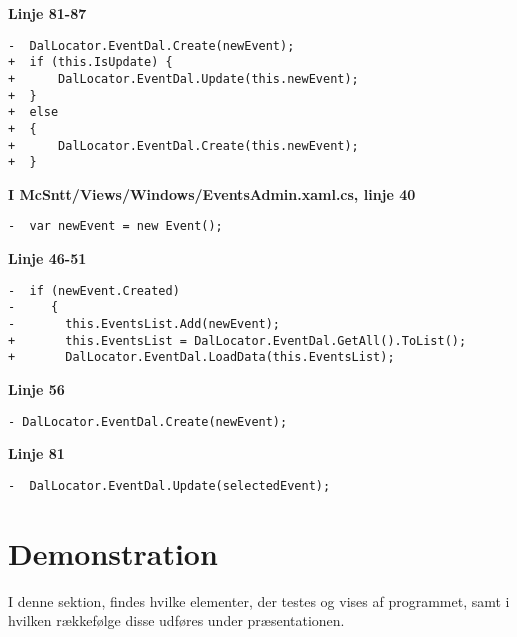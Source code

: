 \documentclass[a4paper,11pt,fleqn,twoside,openright,final]{memoir}
\begin{document}
\textbf{Linje 81-87}
\begin{lstlisting}[frame=single, label=fntpg-cb]
-  DalLocator.EventDal.Create(newEvent);
+  if (this.IsUpdate) {
+      DalLocator.EventDal.Update(this.newEvent);
+  }
+  else
+  {
+      DalLocator.EventDal.Create(this.newEvent);
+  }
\end{lstlisting}

\lstset{firstnumber=40}
\textbf{I McSntt/Views/Windows/EventsAdmin.xaml.cs, linje 40}
\begin{lstlisting}[frame=single, caption=EventsPopup.xaml.cs ændringer, label=fntpg-cb]
-  var newEvent = new Event();
\end{lstlisting}


\lstset{firstnumber=46}
\textbf{Linje 46-51}
\begin{lstlisting}[frame=single, label=fntpg-cb]
-  if (newEvent.Created)
-     {
-       this.EventsList.Add(newEvent);
+       this.EventsList = DalLocator.EventDal.GetAll().ToList();
+       DalLocator.EventDal.LoadData(this.EventsList);
\end{lstlisting}

\lstset{firstnumber=56}
\textbf{Linje 56}
\begin{lstlisting}[frame=single, label=fntpg-cb]
- DalLocator.EventDal.Create(newEvent);
\end{lstlisting}

\lstset{firstnumber=80}
\textbf{Linje 81}
\begin{lstlisting}[frame=single, label=fntpg-cb]
-  DalLocator.EventDal.Update(selectedEvent);
\end{lstlisting}


\chapter{Demonstration}

I denne sektion, findes hvilke elementer, der testes og vises af programmet, samt i hvilken rækkefølge disse udføres under præsentationen.
\end{document}
